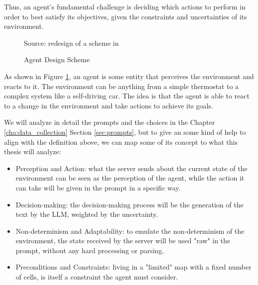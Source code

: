 Thus, an agent's fundamental challenge is deciding which actions to perform in order
to best satisfy its objectives, given the constraints and uncertainties of its
environment.

\begin{figure}[h!]
  \centering
  \caption{Agent Design Scheme}
  { Source: redesign of a scheme in \cite{wooldridge2002multiagent}} \label{fig:agent_scheme}
\end{figure}

As shown in Figure \ref{fig:agent_scheme}, an agent is some entity that
perceives the environment and reacts to it. The environment can be anything from
a simple thermostat to a complex system like a self-driving car. The idea is
that the agent is able to react to a change in the environment and take actions
to achieve its goals.

We will analyze in detail the prompts and the choices in the Chapter
\ref{cha:data_collection} Section \ref{sec:prompts}, but to give an some kind of
help to align with the definition above, we can map some of its concept to what
this thesis will analyze:
\begin{itemize}
  \item Perception and Action: what the server sends about the current state of
    the environment can be seen as the perception of the agent, while the action
    it can take will be given in the prompt in a specific way.

  \item Decision-making: the decision-making process will be the generation of
    the text by the LLM, weighted by the uncertainty.

  \item Non-determinism and Adaptability: to emulate the non-determinism of the
    environment, the state received by the server will be used "raw" in the prompt,
    without any hard processing or parsing.

  \item Preconditions and Constraints: living in a "limited" map with a fixed
    number of cells, is itself a constraint the agent must consider.
\end{itemize}

